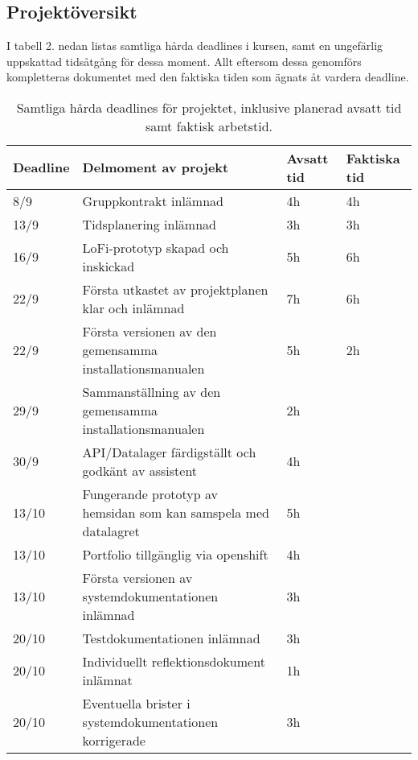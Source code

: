 \documentclass{TDP003mall}
\begin{document}
\pagebreak

\subsection*{Projektöversikt}
%
I tabell 2. nedan listas samtliga hårda deadlines i kursen, samt en ungefärlig uppskattad tidsåtgång för dessa moment. Allt eftersom dessa genomförs kompletteras dokumentet med den faktiska tiden som ägnats åt vardera deadline.

\begin{table}[h]
\begin{tabularx}{\textwidth}{|l|X|l|l|}
\hline
Deadline & Delmoment av projekt   & Avsatt tid & Faktiska tid\\ \hline
    8/9  & Gruppkontrakt inlämnad      & 4h     & 4h      \\ \hline
    13/9 & Tidsplanering inlämnad   & 3h     & 3h       \\ \hline
    16/9 & LoFi-prototyp skapad och inskickad  & 5h    & 6h    \\ \hline
    22/9 & Första utkastet av projektplanen klar och inlämnad & 7h & 6h \\ \hline
    22/9 & Första versionen av den gemensamma installationsmanualen & 5h  & 2h  \\ \hline
    29/9  & Sammanställning av den gemensamma installationsmanualen  & 2h  &   \\ \hline
    30/9 & API/Datalager färdigställt och godkänt av assistent & 4h  & \\ \hline
    13/10 & Fungerande prototyp av hemsidan som kan samspela med datalagret & 5h &   \\ \hline
    13/10 & Portfolio tillgänglig via openshift  & 4h     &     \\ \hline
    13/10 & Första versionen av systemdokumentationen inlämnad  & 3h  & \\ \hline
    20/10 & Testdokumentationen inlämnad  & 3h   &     \\ \hline
    20/10 & Individuellt reflektionsdokument inlämnat  & 1h   &  \\ \hline
    20/10 & Eventuella brister i systemdokumentationen korrigerade  & 3h        &  \\ \hline
\end{tabularx}
\centering
    \caption{\label{tab:table-name}Samtliga hårda deadlines för projektet, inklusive planerad avsatt tid samt faktisk arbetstid.}
\end{table}
\end{document}
